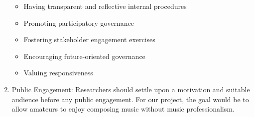 \begin{enumerate}
\begin{itemize}
        \item Having transparent and reflective internal procedures
        \item Promoting participatory governance
        \item Fostering stakeholder engagement exercises
        \item Encouraging future-oriented governance
        \item Valuing responsiveness
    \end{itemize}
    \item Public Engagement: Researchers should settle upon a motivation and suitable audience before any public engagement. For our project, the goal would be to allow amateurs to enjoy composing music without
    music professionalism.
\end{enumerate}
